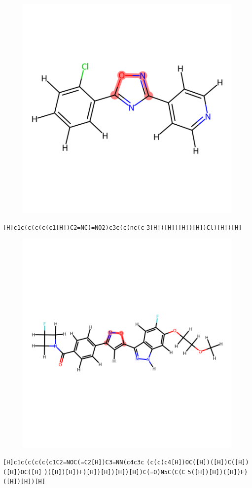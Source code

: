 \documentclass{article}
\begin{document}
\begin{figure}[ht]
\centering
    \includegraphics{mol226.png}
\end{figure}
\verb|[H]c1c(c(c(c(c1[H])C2=NC(=NO2)c3c(c(nc(c| \verb|3[H])[H])[H])[H])Cl)[H])[H]|

\begin{figure}[ht]
\centering
    \includegraphics{mol227.png}
\end{figure}
\verb|[H]c1c(c(c(c(c1C2=NOC(=C2[H])C3=NN(c4c3c| \verb|(c(c(c4[H])OC([H])([H])C([H])([H])OC([H]| \verb|)([H])[H])F)[H])[H])[H])[H])C(=O)N5C(C(C| \verb|5([H])[H])([H])F)([H])[H])[H]|
\end{document}
